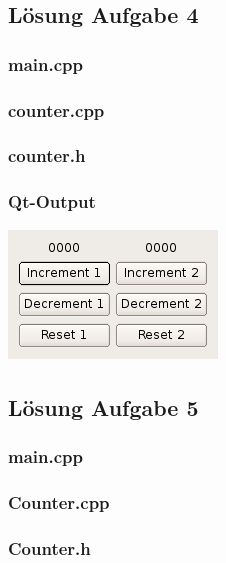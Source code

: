 \subsection{Lösung Aufgabe 4}
\subsubsection{main.cpp}

\subsubsection{counter.cpp}

\subsubsection{counter.h}

\subsubsection{Qt-Output}
\begin{center}
	\includegraphics[scale=.5]{./images/u12a4.png}
\end{center}

\subsection{Lösung Aufgabe 5}
\subsubsection{main.cpp}

\subsubsection{Counter.cpp}

\subsubsection{Counter.h}

